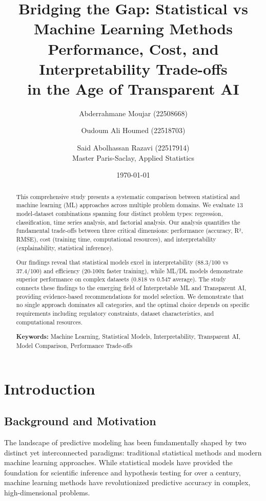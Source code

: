 \documentclass[11pt,a4paper]{article}
\title{Bridging the Gap: Statistical vs Machine Learning Methods\\
\large Performance, Cost, and Interpretability Trade-offs\\
\large in the Age of Transparent AI}
\author{Abderrahmane Moujar (22508668) \and Oudoum Ali Houmed (22518703)\and Said Abolhassan Razavi (22517914)\\
\small Master Paris-Saclay, Applied Statistics}
\date{\today}
\begin{document}
\maketitle

\begin{abstract}
This comprehensive study presents a systematic comparison between statistical and machine learning (ML) approaches across multiple problem domains. We evaluate 13 model-dataset combinations spanning four distinct problem types: regression, classification, time series analysis, and factorial analysis. Our analysis quantifies the fundamental trade-offs between three critical dimensions: \textcolor{mlcolor}{performance} (accuracy, R², RMSE), \textcolor{statcolor}{cost} (training time, computational resources), and \textcolor{accentcolor}{interpretability} (explainability, statistical inference). 

Our findings reveal that statistical models excel in interpretability (88.3/100 vs 37.4/100) and efficiency (20-100x faster training), while ML/DL models demonstrate superior performance on complex datasets (0.818 vs 0.547 average). The study connects these findings to the emerging field of Interpretable ML and Transparent AI, providing evidence-based recommendations for model selection. We demonstrate that no single approach dominates all categories, and the optimal choice depends on specific requirements including regulatory constraints, dataset characteristics, and computational resources.

\textbf{Keywords:} Machine Learning, Statistical Models, Interpretability, Transparent AI, Model Comparison, Performance Trade-offs
\end{abstract}

\tableofcontents
\newpage

\section{Introduction}

\subsection{Background and Motivation}

The landscape of predictive modeling has been fundamentally shaped by two distinct yet interconnected paradigms: traditional statistical methods and modern machine learning approaches. While statistical models have provided the foundation for scientific inference and hypothesis testing for over a century, machine learning methods have revolutionized predictive accuracy in complex, high-dimensional problems.
\end{document}
